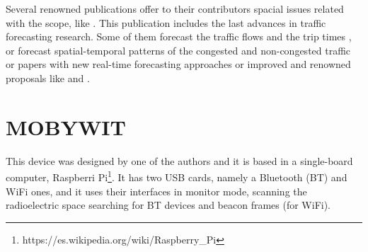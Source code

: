 \documentclass[preprint]{elsarticle}
\begin{document}

Several renowned publications offer to their contributors spacial issues related with the scope, like \cite{Zhang20141}. This publication includes the last advances in traffic forecasting research. Some of them forecast the traffic flows and the trip times \citep{Dong201420}, \cite{Zou201433} or forecast spatial-temporal patterns of the congested and non-congested traffic or papers with new real-time forecasting approaches \cite{Zhang201465} or improved and renowned proposals like \cite{Wang201479} and \cite{Qi201495}.





\section{MOBYWIT}
\label{sec:mobywit}

This device was designed by one of the authors and it is based in a single-board computer, Raspberri Pi\footnote{https://es.wikipedia.org/wiki/Raspberry\_Pi}. It has two USB cards, namely a Bluetooth (BT) and WiFi ones, and it uses their interfaces in monitor mode, scanning the radioelectric space searching for BT devices and beacon frames (for WiFi).
\end{document}
